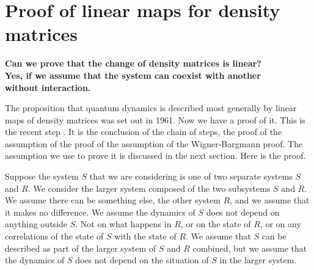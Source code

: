 \documentclass[pra, 12pt, showkeys, eqsecnum]{revtex4}
\begin{document}
\section{Proof of linear maps for density matrices}\label{seven}

\bigskip
\large
\noindent
\textbf{Can we prove that the change of density matrices is linear? \\ 
Yes, if we assume that the system can coexist with another \\ without interaction.} \\
\smallskip 
\normalsize

\noindent
The proposition that quantum dynamics is described most generally by linear maps of density matrices was set out\cite{sudarshan61a,jordan61} in 1961. Now we have a proof of it. This is the recent step \cite{me80}. It is the conclusion of the chain of steps, the proof of the assumption of the proof of the assumption of the Wigner-Bargmann proof. The assumption we use to prove it is discussed in the next section. Here is the proof.

Suppose the system $S$ that we are considering is one of two separate systems $S$ and $R$. We consider the larger system composed of the two subsystems $S$ and $R$. We assume there can be something else, the other system $R$, and we assume that it makes no difference. We assume the dynamics of $S$ does not depend on anything outside $S$. Not on what happens in $R$, or on the state of $R$, or on any correlations of the state of $S$ with the state of $R$. We assume that $S$ can be described as part of the larger system of $S$ and $R$ combined, but we assume that the dynamics of $S$ does not depend on the situation of $S$ in the larger system.
\end{document}
